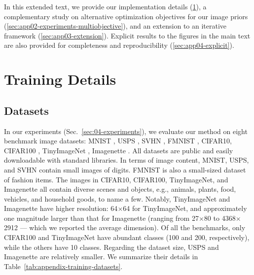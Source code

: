\begin{foldable} %
    In this extended text, we provide our implementation details (\ref{sec:app01-training}), a complementary study on alternative optimization objectives for our image priors (\ref{sec:app02-experiments-multiobjective}), and an extension to an iterative framework (\ref{sec:app03-extension}). Explicit results to the figures in the main text are also provided for completeness and reproducibility (\ref{sec:app04-explicit}).
\end{foldable}



\section{Training Details} \label{sec:app01-training}
\renewcommand{\thefigure}{A.\arabic{figure}}
\renewcommand{\thetable}{A.\arabic{table}}
\renewcommand{\theequation}{A.\arabic{equation}}
\setcounter{figure}{0}
\setcounter{table}{0}
\setcounter{equation}{0}

\subsection{Datasets} \label{ssec:app01-training-datasets}
\begin{foldable} %
    In our experiments (Sec.~\ref{sec:04-experiments}), we evaluate our method on eight benchmark image datasets: MNIST \citep{lecun2002gradient}, USPS \citep{hull1994database}, SVHN \citep{netzer2011reading}, FMNIST \citep{xiao2017fashion}, CIFAR10, CIFAR100 \citep{krizhevsky2009learning}, TinyImageNet \citep{le2015tiny}, Imagenette \citep{howard2020imagenette}.
    All datasets are public and easily downloadable with standard libraries.
    In terms of image content, MNIST, USPS, and SVHN contain small images of digits.
    FMNIST is also a small-sized dataset of fashion items.
    The images in CIFAR10, CIFAR100, TinyImageNet, and Imagenette all contain diverse scenes and objects, e.g., animals, plants, food, vehicles, and household goods, to name a few.
    Notably, TinyImageNet and Imagenette have higher resolution: 64$\times$64 for TinyImageNet, and approximately one magnitude larger than that for Imagenette (ranging from 27$\times$80 to 4368$\times$2912 --- which we reported the average dimension).
    Of all the benchmarks, only CIFAR100 and TinyImageNet have abundant classes (100 and 200, respectively), while the others have 10 classes.
    Regarding the dataset size, USPS and Imagenette are relatively smaller.
    We summarize their details in Table~\ref{tab:appendix-training-datasets}.
\end{foldable}

